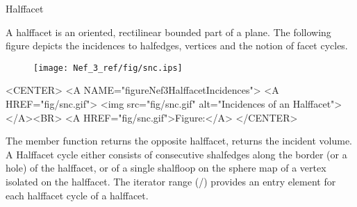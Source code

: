 
\ccRefPageBegin



\begin{ccRefClass}{Halffacet}

\ccDefinition

A halffacet is an oriented, rectilinear bounded part of a plane. The following
figure depicts the incidences to halfedges, vertices and the notion of facet
cycles.

\begin{ccTexOnly}
    \begin{figure}[bht]
        \begin{center}
          \parbox{0.4\textwidth}{%
              \texttt{[image: Nef\_3\_ref/fig/snc.ips]}%
          }
        \end{center}
        \label{figureNef3FacetIncidences}
    \end{figure}
\end{ccTexOnly}

\begin{ccHtmlOnly}
    <CENTER>
    <A NAME="figureNef3HalffacetIncidences">
    <A HREF="fig/snc.gif">
        <img src="fig/snc.gif" 
             alt="Incidences of an Halffacet"></A><BR>
    <A HREF="fig/snc.gif">Figure:</A>
    </CENTER>
\end{ccHtmlOnly}

The member function  returns the opposite halffacet, 
returns the incident volume. A Halffacet cycle either consists of consecutive
shalfedges along the border (or a hole) of the halffacet, or of a single
shalfloop on the sphere map of a vertex isolated on the halffacet. The 
iterator range (/)
provides an entry element for each halffacet cycle of a halffacet.


\ccTypes
{}
\ccThreeToTwo


\end{ccRefClass}
